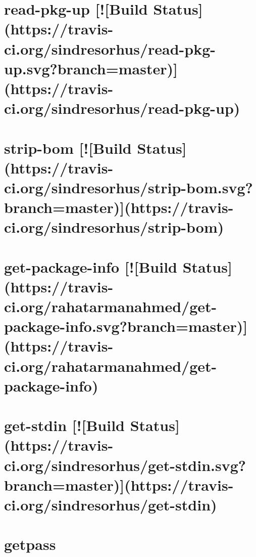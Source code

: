 \documentclass[twoside]{book}
\newcommand{\+}{\discretionary{\mbox{\scriptsize$\hookleftarrow$}}{}{}}
\begin{document}
\chapter{read-\/pkg-\/up \mbox{[}!\mbox{[}Build Status\mbox{]}(https\+://travis-\/ci.org/sindresorhus/read-\/pkg-\/up.svg?branch=master)\mbox{]}(https\+://travis-\/ci.org/sindresorhus/read-\/pkg-\/up)}
\label{md_dsmacc_vis_degree_node_modules_get-package-info_node_modules_read-pkg-up_readme}

\chapter{strip-\/bom \mbox{[}!\mbox{[}Build Status\mbox{]}(https\+://travis-\/ci.org/sindresorhus/strip-\/bom.svg?branch=master)\mbox{]}(https\+://travis-\/ci.org/sindresorhus/strip-\/bom)}
\label{md_dsmacc_vis_degree_node_modules_get-package-info_node_modules_strip-bom_readme}

\chapter{get-\/package-\/info \mbox{[}!\mbox{[}Build Status\mbox{]}(https\+://travis-\/ci.org/rahatarmanahmed/get-\/package-\/info.svg?branch=master)\mbox{]}(https\+://travis-\/ci.org/rahatarmanahmed/get-\/package-\/info)}
\label{md_dsmacc_vis_degree_node_modules_get-package-info_README}

\chapter{get-\/stdin \mbox{[}!\mbox{[}Build Status\mbox{]}(https\+://travis-\/ci.org/sindresorhus/get-\/stdin.svg?branch=master)\mbox{]}(https\+://travis-\/ci.org/sindresorhus/get-\/stdin)}
\label{md_dsmacc_vis_degree_node_modules_get-stdin_readme}

\chapter{getpass}
\label{md_dsmacc_vis_degree_node_modules_getpass_README}

\end{document}
